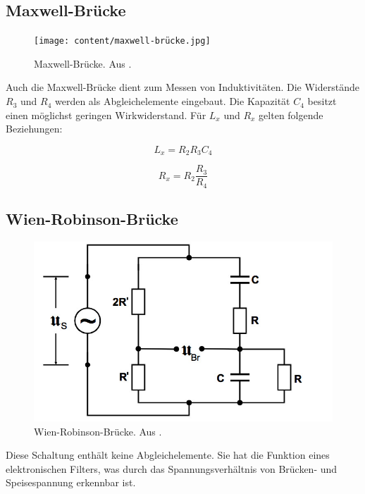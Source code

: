 \subsection{Maxwell-Brücke}

\begin{figure}
  \centering
  \texttt{[image: content/maxwell-brücke.jpg]}
  \caption{Maxwell-Brücke. Aus \cite{anleitung302}.}
  \label{fig:maxwell}
\end{figure}

Auch die Maxwell-Brücke dient zum Messen von Induktivitäten. Die Widerstände $R_3$ und $R_4$ werden als Abgleichelemente eingebaut. Die Kapazität $C_4$ besitzt einen möglichst geringen Wirkwiderstand. Für $L_x$ und $R_x$ gelten folgende Beziehungen:

\begin{equation}
  L_x = R_{2} R_3 C_4
\end{equation}

\begin{equation}
  R_x = R_{2} \frac {R_3}{R_4}
\end{equation}

\subsection{Wien-Robinson-Brücke}

\begin{figure}
  \centering
  \includegraphics[scale=0.5]{content/wien-robinson.jpg}
  \caption{Wien-Robinson-Brücke. Aus \cite{anleitung302}.}
  \label{fig:wien-robinson}
\end{figure}

Diese Schaltung enthält keine Abgleichelemente. Sie hat die Funktion eines elektronischen Filters, was durch das Spannungsverhältnis von Brücken- und Speisespannung erkennbar ist.


